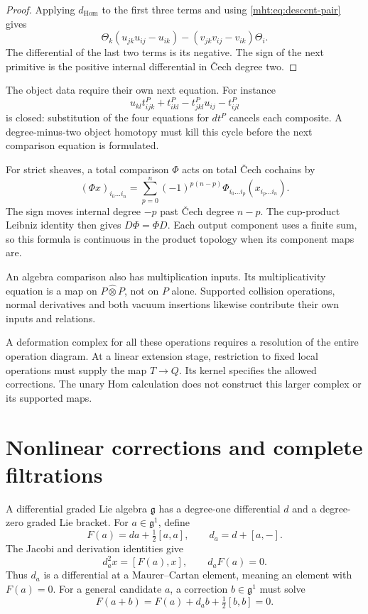 \begin{proof}
Applying $d_{\mathrm{Hom}}$ to the first three terms and using
\eqref{mht:eq:descent-pair} gives
\[
 \Theta_k(u_{jk}u_{ij}-u_{ik})
       -(v_{jk}v_{ij}-v_{ik})\Theta_i.
\]
The differential of the last two terms is its negative. The sign
of the next primitive is the positive internal differential in
\v Cech degree two.
\end{proof}

The object data require their own next equation. For instance
\[
 u_{kl}t^P_{ijk}+t^P_{ikl}-t^P_{jkl}u_{ij}-t^P_{ijl}
\]
is closed: substitution of the four equations for $dt^P$ cancels
each composite. A degree-minus-two object homotopy must kill this
cycle before the next comparison equation is formulated.

For strict sheaves, a total comparison $\Phi$ acts on total
\v Cech cochains by
\[
 (\Phi x)_{i_0\ldots i_n}
 =\sum_{p=0}^n(-1)^{p(n-p)}
   \Phi_{i_0\ldots i_p}(x_{i_p\ldots i_n}).
\]
The sign moves internal degree $-p$ past \v Cech degree $n-p$.
The cup-product Leibniz identity then gives $D\Phi=\Phi D$.
Each output component uses a finite sum, so this formula is
continuous in the product topology when its component maps are.

An algebra comparison also has multiplication inputs. Its
multiplicativity equation is a map on $P\widehat\otimes P$,
not on $P$ alone. Supported collision operations, normal
derivatives and both vacuum insertions likewise contribute their
own inputs and relations.

A deformation complex for all these
operations requires a resolution of the entire operation diagram.
At a linear extension stage, restriction to fixed local operations
must supply the map $T\to Q$. Its kernel specifies the allowed
corrections. The unary Hom calculation does not construct this
larger complex or its supported maps.

\section{Nonlinear corrections and complete filtrations}

A differential graded Lie algebra $\mathfrak g$ has a degree-one
differential $d$ and a degree-zero graded Lie bracket. For
$a\in\mathfrak g^1$, define
\[
 F(a)=da+\tfrac12[a,a],\qquad d_a=d+[a,-].
\]
The Jacobi and derivation identities give
\begin{equation}\label{mht:eq:curvature-bianchi}
 d_a^2x=[F(a),x],\qquad d_aF(a)=0.
\end{equation}
Thus $d_a$ is a differential at a Maurer--Cartan element, meaning
an element with $F(a)=0$. For a general candidate $a$, a correction
$b\in\mathfrak g^1$ must solve
\begin{equation}\label{mht:eq:full-curvature-correction}
 F(a+b)=F(a)+d_ab+\tfrac12[b,b]=0.
\end{equation}

